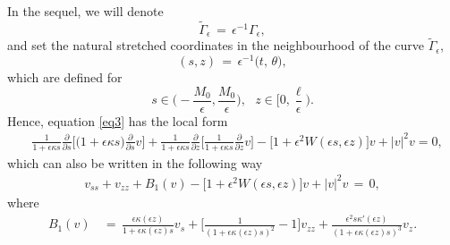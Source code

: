 \documentclass[10pt, reqno]{amsart}
\numberwithin{equation}{section}
\theoremstyle{definition}
\begin{document}
{\medskip
 In the sequel, we will denote
\begin{equation}\label{eqDepsilon}
\tilde{\Gamma}_\epsilon \,=\, \epsilon^{-1}\Gamma_\epsilon,
\end{equation}
and set the natural stretched coordinates in the neighbourhood of the curve $\tilde{\Gamma}_\epsilon$,
\begin{equation}\label{eqszfinal}
(s, z) \,=\,
\epsilon^{-1} \big(t,\, \theta\big),
\end{equation}
which are defined for
\begin{equation}\label{eqFermi-stretched}
s\in \Big(- \frac{ M_0}{\epsilon}, \frac{ M_0}{\epsilon}\Big), \ \ \ z\in
\Big[0, \frac{\ell}{\epsilon} \Big).
\end{equation}
Hence, equation \eqref{eq3} has the local form
\begin{align} \label{eq3.1}
& \frac{1}{1+\epsilon \kappa s} \frac{\partial}{\partial s} \Big[ \big(1+\epsilon \kappa s\big) \frac{\partial}{\partial s} v \Big]
 +
 \frac{1}{1+\epsilon \kappa s}\frac{\partial}{\partial z} \Big[ \frac{1}{1+\epsilon \kappa s} \frac{\partial}{\partial z} v \Big]
 -
 \big[1+ \epsilon^2 W (\epsilon s, \epsilon z) \big] v + |v|^2 v
 =0,
\end{align}
which can also be written in the following way
\begin{align}
v_{ss} + v_{zz} + B_1 (v) - \big[1+ \epsilon^2 W (\epsilon s, \epsilon z) \big] v + |v|^2 v \,=\, 0,
\label{equationlocal}
\end{align}
 where
\begin{align}
B_1(v)
& \,=\,
\frac{\epsilon \kappa (\epsilon z) }{1+\epsilon \kappa (\epsilon z) s} v_{s}
+\Big[ \frac{1}{(1+\epsilon \kappa(\epsilon z) s)^2 } -1 \Big]v_{zz}
+\frac{\epsilon^2 s \kappa' (\epsilon z) }{(1+\epsilon \kappa (\epsilon z) s)^3 }v_z.
\label{B1}
\end{align}


}
\end{document}
